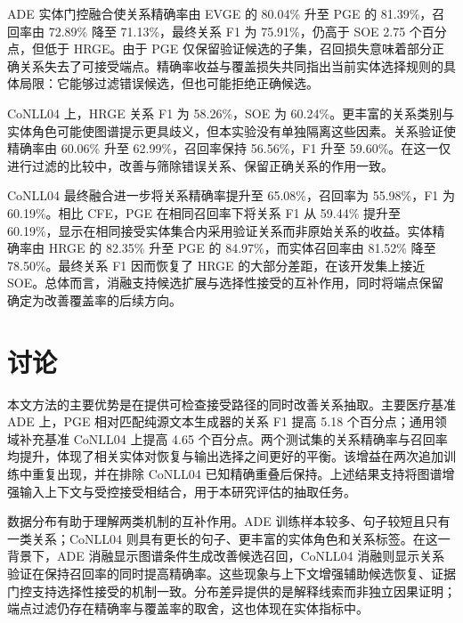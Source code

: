 \documentclass[UTF8,a4paper,twocolumn,10pt]{ctexart}
\begin{document}
ADE 实体门控融合使关系精确率由 EVGE 的 80.04\% 升至 PGE 的 81.39\%，召回率由 72.89\% 降至 71.13\%，最终关系 F1 为 75.91\%，仍高于 SOE 2.75 个百分点，但低于 HRGE。由于 PGE 仅保留验证候选的子集，召回损失意味着部分正确关系失去了可接受端点。精确率收益与覆盖损失共同指出当前实体选择规则的具体局限：它能够过滤错误候选，但也可能拒绝正确候选。

CoNLL04 上，HRGE 关系 F1 为 58.26\%，SOE 为 60.24\%。更丰富的关系类别与实体角色可能使图谱提示更具歧义，但本实验没有单独隔离这些因素。关系验证使精确率由 60.06\% 升至 62.99\%，召回率保持 56.56\%，F1 升至 59.60\%。在这一仅进行过滤的比较中，改善与筛除错误关系、保留正确关系的作用一致。

CoNLL04 最终融合进一步将关系精确率提升至 65.08\%，召回率为 55.98\%，F1 为 60.19\%。相比 CFE，PGE 在相同召回率下将关系 F1 从 59.44\% 提升至 60.19\%，显示在相同接受实体集合内采用验证关系而非原始关系的收益。实体精确率由 HRGE 的 82.35\% 升至 PGE 的 84.97\%，而实体召回率由 81.52\% 降至 78.50\%。最终关系 F1 因而恢复了 HRGE 的大部分差距，在该开发集上接近 SOE。总体而言，消融支持候选扩展与选择性接受的互补作用，同时将端点保留确定为改善覆盖率的后续方向。

\begin{table}[t]
\centering\scriptsize
\caption{统一严格跨度评估器下的开发集消融（micro，\%）。这些系统用于刻画固定架构，并非额外晋级的测试系统。}
\label{zh:tab:ablation}
\resizebox{\textwidth}{!}{}
\end{table}

\section{讨论}
本文方法的主要优势是在提供可检查接受路径的同时改善关系抽取。主要医疗基准 ADE 上，PGE 相对匹配纯源文本生成器的关系 F1 提高 5.18 个百分点；通用领域补充基准 CoNLL04 上提高 4.65 个百分点。两个测试集的关系精确率与召回率均提升，体现了相关实体对恢复与输出选择之间更好的平衡。该增益在两次追加训练中重复出现，并在排除 CoNLL04 已知精确重叠后保持。上述结果支持将图谱增强输入上下文与受控接受相结合，用于本研究评估的抽取任务。

数据分布有助于理解两类机制的互补作用。ADE 训练样本较多、句子较短且只有一类关系；CoNLL04 则具有更长的句子、更丰富的实体角色和关系标签。在这一背景下，ADE 消融显示图谱条件生成改善候选召回，CoNLL04 消融则显示关系验证在保持召回率的同时提高精确率。这些现象与上下文增强辅助候选恢复、证据门控支持选择性接受的机制一致。分布差异提供的是解释线索而非独立因果证明；端点过滤仍存在精确率与覆盖率的取舍，这也体现在实体指标中。
\end{document}
